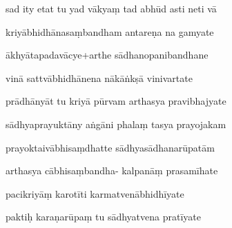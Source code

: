 \documentclass[article,12pt,a4paper]{memoir}%
\newcounter{parCount}
\begin{document}
	  
	  \pstart {} sad ity etat tu yad vākyaṃ tad abhūd asti neti vā 
	{}
	\pend%
      

	  
	  \pstart \leavevmode%
	kriyābhidhānasaṃbandham antareṇa na gamyate 
	{}
	\pend%
      

	  
	  \pstart {} ākhyātapadavācye+arthe sādhanopanibandhane 
	{}
	\pend%
      

	  
	  \pstart \leavevmode%
	vinā sattvābhidhānena nākāṅkṣā vinivartate 
	{}
	\pend%
      

	  
	  \pstart {} prādhānyāt tu kriyā pūrvam arthasya pravibhajyate 
	{}
	\pend%
      

	  
	  \pstart \leavevmode%
	sādhyaprayuktāny aṅgāni phalaṃ tasya prayojakam 
	{}
	\pend%
      

	  
	  \pstart {} prayoktaivābhisaṃdhatte sādhyasādhanarūpatām 
	{}
	\pend%
      

	  
	  \pstart \leavevmode%
	arthasya cābhisaṃbandha- kalpanāṃ prasamīhate 
	{}
	\pend%
      

	  
	  \pstart {} pacikriyāṃ karotīti karmatvenābhidhīyate 
	{}
	\pend%
      

	  
	  \pstart \leavevmode%
	paktiḥ karaṇarūpaṃ tu sādhyatvena pratīyate 
	{}
	\pend%
      
\end{document}

